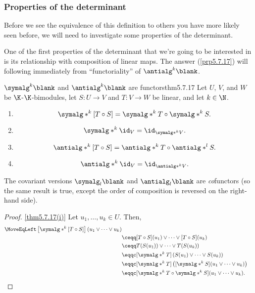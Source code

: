 \subsubsection{Properties of the determinant}

Before we see the equivalence of this definition to others you have more likely seen before, we will need to investigate some properties of the determinant.

One of the first properties of the determinant that we're going to be interested in is its relationship with composition of linear maps.  The answer (\cref{prp5.7.17}) will following immediately from ``functoriality'' of $\antialg ^k\blank$.
\begin{thm}{$\symalg ^k\blank$ and $\antialg ^k\blank$ are functors}{thm5.7.17}
	Let $U$, $V$, and $W$ be $\K$-$\K$-bimodules, let $S\colon U\rightarrow V$ and $T\colon V\rightarrow W$ be linear, and let $k\in \N$.
	\begin{enumerate}
		\item \label{thm5.7.17(i)}
		\begin{equation}
		\symalg* ^k[T\circ S]=\symalg* ^kT\circ \symalg* ^kS.
		\end{equation}
		\item \label{thm5.7.17(ii)}
		\begin{equation}
		\symalg* ^k\id _V=\id _{\symalg* ^kV}.
		\end{equation}
		\item \label{thm5.7.17(iii)}
		\begin{equation}
		\antialg* ^k[T\circ S]=\antialg* ^kT\circ \antialg* ^lS.
		\end{equation}
		\item \label{thm5.7.17(iv)}
		\begin{equation}
		\antialg* ^k\id _V=\id _{\antialg* ^kV}.
		\end{equation}
	\end{enumerate}
	\begin{rmk}
		The covariant versions $\symalg _l\blank$ and $\antialg _l\blank$ are \emph{co}functors (so the same result is true, except the order of composition is reversed on the right-hand side).
	\end{rmk}
	\begin{proof}
		\cref{thm5.7.17(i)} Let $u_1,\ldots ,u_k\in U$.  Then,
		\begin{equation}
			\begin{split}
			\MoveEqLeft
			\left[ \symalg* ^k[T\circ S]\right] (u_1\vee \cdots \vee u_k) \\
			& \ceqq [T\circ S](u_1)\vee \cdots \vee [T\circ S](u_k) \\
			& \ceqq T(S(u_1))\vee \cdots \vee T(S(u_k)) \\
			& \eqqc [\symalg* ^kT]\left( S(u_1)\vee \cdots \vee S(u_k)\right) \\
			& \eqqc [\symalg* ^kT]\left( [\symalg* ^kS](u_1\vee \cdots \vee u_k)\right) \\
			& \eqqc [\symalg* ^kT\circ \symalg* ^kS](u_1\vee \cdots \vee u_k).
			\end{split}
		\end{equation}
		

\end{proof}
\end{thm}
